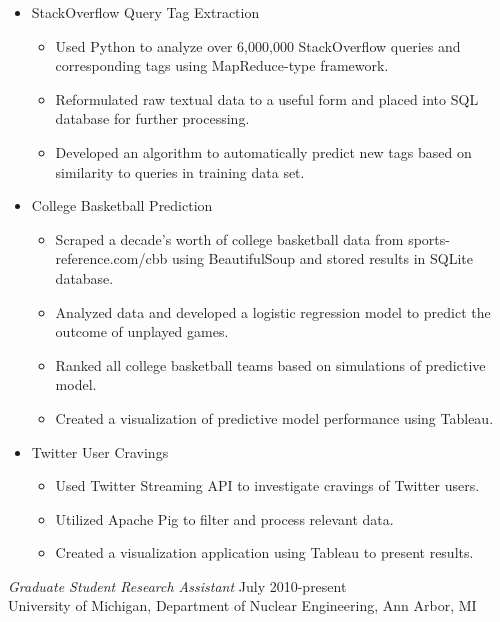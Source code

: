 \documentclass[margin, 10pt]{res} %
\begin{document}
\begin{resume}
\begin{itemize} \itemsep -2pt %
\item StackOverflow Query Tag Extraction
\begin{itemize}
\item Used Python to analyze over 6,000,000 StackOverflow queries and corresponding tags using MapReduce-type framework.  
\item Reformulated raw textual data to a useful form and placed into SQL database for further processing.
\item Developed an algorithm to automatically predict new tags based on similarity to queries in training data set. 
\end{itemize}
\item College Basketball Prediction
\begin{itemize}
\item Scraped a decade's worth of college basketball data from sports-reference.com/cbb using BeautifulSoup and stored results in SQLite database.  
\item Analyzed data and developed a logistic regression model to predict the outcome of unplayed games. 
\item Ranked all college basketball teams based on simulations of predictive model. 
\item Created a visualization of predictive model performance using Tableau.
\end{itemize}
\item Twitter User Cravings
\begin{itemize}
\item Used Twitter Streaming API to investigate cravings of Twitter users. 
\item Utilized Apache Pig to filter and process relevant data. 
\item Created a visualization application using Tableau to present results. 
\end{itemize}
\end{itemize}

{\sl Graduate Student Research Assistant} \hfill July 2010-present \\
University of Michigan, Department of Nuclear Engineering, Ann Arbor, MI


\end{resume}
\end{document}
